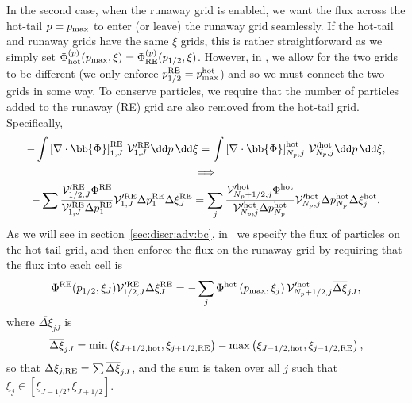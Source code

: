 \documentclass{notes}
\newcommand{\Vp}{\mathcal{V}'}
\begin{document}
    In the second case, when the runaway grid is enabled, we want the flux
    across the hot-tail $p=p_{\rm max}$ to enter (or leave) the runaway grid
    seamlessly. If the hot-tail and runaway grids have the same $\xi$ grids,
    this is rather straightforward as we simply set 
    $\Phi^{(p)}_{\rm hot}(p_{\rm max},\xi) = \Phi^{(p)}_{\rm RE}(p_{1/2},\xi)$.
    However, in \DREAM, we allow for the two grids to be different (we only
    enforce $p^{\rm RE}_{1/2} = p^{\rm hot}_{\rm max}$) and so we must connect
    the two grids in some way. To conserve particles, we require that the
	number of particles added to the runaway (RE) grid are also removed from
	the hot-tail grid. Specifically,
	\begin{equation}\label{eq:fluxCross_origin}
		\begin{gathered}
			-\int \left[\nabla\cdot\bb{\Phi}\right]^{\rm RE}_{1,J}\,\Vp^{\rm RE}_{1,J}\dd p\,\dd\xi =
			\int \left[\nabla\cdot\bb{\Phi}\right]^{\rm hot}_{N_p,j}\,\Vp^{\rm hot}_{N_p,j}\dd p\,\dd\xi,\\
			\implies\\
			-\sum\frac{\Vp^{\rm RE}_{1/2,J}\Phi^{\rm RE}}{\Vp^{\rm RE}_{1,J}\Delta p^{\rm RE}_1}\Vp^{\rm RE}_{1,J}\Delta p^{\rm RE}_1 \Delta\xi^{\rm RE}_J =
			\sum_j\frac{\Vp^{\rm hot}_{N_p+1/2,j}\Phi^{\rm hot}}{\Vp^{\rm hot}_{N_p,j}\Delta p^{\rm hot}_{N_p}}\Vp^{\rm hot}_{N_p,j}\Delta p^{\rm hot}_{N_p}\Delta\xi^{\rm hot}_{j}, %
		\end{gathered}
	\end{equation}
    As we will see in section~\ref{sec:discr:adv:bc}, in \DREAM\ we specify the
    flux of particles on the hot-tail grid, and then enforce the flux on the
    runaway grid by requiring that the flux into each cell is
    \begin{equation}\label{eq:fluxCross}
        \Phi^{\rm RE}(p_{1/2},\xi_J) \Vp^{\rm RE}_{1/2,J} \Delta\xi^{\rm RE}_J =
        -\sum_j \Phi^{\rm hot}\left(p_{\rm max},\xi_j\right) \Vp^{\rm hot}_{N_p+1/2,j} \overline{\Delta\xi}_{jJ},
    \end{equation}
	where $\overline{\Delta\xi}_{jJ}$ is
    \begin{equation}\label{eq:PhiPinterp}
        \overline{\Delta\xi}_{jJ} = \min\left(\xi_{J+1/2,{\rm hot}},\xi_{j+1/2,{\rm RE}}\right) -
        \max\left( \xi_{J-1/2,{\rm hot}}, \xi_{j-1/2,{\rm RE}} \right),
    \end{equation}
    so that $\Delta\xi_{j,\rm RE} = \sum\overline{\Delta\xi}_{jJ}$, and
	the sum is taken over all $j$ such that $\xi_j\in[\xi_{J-1/2}, \xi_{J+1/2}]$.
\end{document}

